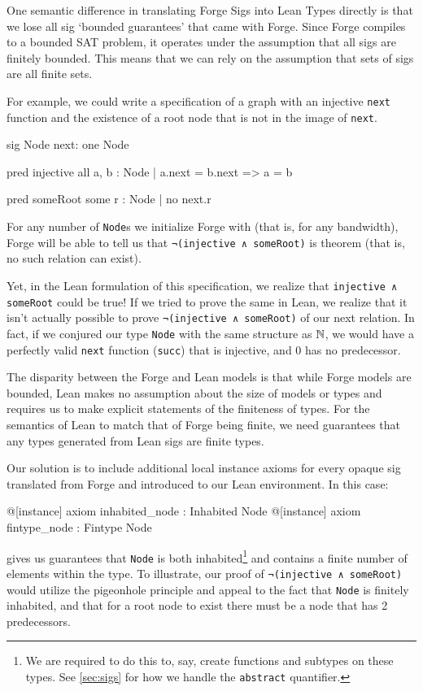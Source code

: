 One semantic difference in translating Forge Sigs into Lean Types directly is that we lose all sig `bounded guarantees' that came with Forge. Since Forge compiles to a bounded SAT problem, it operates under the assumption that all sigs are finitely bounded. This means that we can rely on the assumption that sets of sigs are all finite sets. 

For example, we could write a specification of a graph with an injective \texttt{next} function and the existence of a root node that is not in the image of \texttt{next}. 
\begin{forge*}
sig Node {
  next: one Node
}

pred injective {
  all a, b : Node | 
    a.next = b.next => a = b
}

pred someRoot {
  some r : Node | 
    no next.r
}
\end{forge*}
For any number of \texttt{Node}s we initialize Forge with (that is, for any bandwidth), Forge will be able to tell us that \texttt{¬(injective ∧ someRoot)} is theorem (that is, no such relation can exist). 

Yet, in the Lean formulation of this specification, we realize that \texttt{injective ∧ someRoot} could be true! If we tried to prove the same in Lean, we realize that it isn't actually possible to prove \texttt{¬(injective ∧ someRoot)} of our next relation. In fact, if we conjured our type \texttt{Node} with the same structure as $\mathbb N$, we would have a perfectly valid \texttt{next} function (\texttt{succ}) that is injective, and $0$ has no predecessor. 

The disparity between the Forge and Lean models is that while Forge models are bounded, Lean makes no assumption about the size of models or types and requires us to make explicit statements of the finiteness of types. For the semantics of Lean to match that of Forge being finite, we need guarantees that any types generated from Lean sigs are finite types. 

Our solution is to include additional local instance axioms for every opaque sig translated from Forge and introduced to our Lean environment. In this case: 
\begin{lean*}
@[instance] axiom inhabited_node : Inhabited Node
@[instance] axiom fintype_node : Fintype Node
\end{lean*}
gives us guarantees that \texttt{Node} is both inhabited\footnote{We are required to do this to, say, create functions and subtypes on these types. See \cref{sec:sigs} for how we handle the \texttt{abstract} quantifier.} and contains a finite number of elements within the type. To illustrate, our proof of \texttt{¬(injective ∧ someRoot)} would utilize the pigeonhole principle and appeal to the fact that \texttt{Node} is finitely inhabited, and that for a root node to exist there must be a node that has 2 predecessors. 

